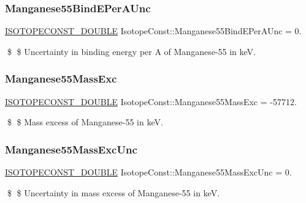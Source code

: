 \subsubsection{\texorpdfstring{Manganese55\+Bind\+E\+Per\+A\+Unc}{Manganese55BindEPerAUnc}}
{\footnotesize\ttfamily \mbox{\hyperlink{group___isotope_const-_macros_ga8f45a7272ce02c0b4c65c44636ed719a}{I\+S\+O\+T\+O\+P\+E\+C\+O\+N\+S\+T\+\_\+\+D\+O\+U\+B\+LE}} Isotope\+Const\+::\+Manganese55\+Bind\+E\+Per\+A\+Unc = 0.}

\$ \$ Uncertainty in binding energy per A of Manganese-\/55 in keV. \mbox{\label{group___isotope_const-_manganese-_mn55_ga6fbe24781375726f57bdf2a268d6f691}} 
\subsubsection{\texorpdfstring{Manganese55\+Mass\+Exc}{Manganese55MassExc}}
{\footnotesize\ttfamily \mbox{\hyperlink{group___isotope_const-_macros_ga8f45a7272ce02c0b4c65c44636ed719a}{I\+S\+O\+T\+O\+P\+E\+C\+O\+N\+S\+T\+\_\+\+D\+O\+U\+B\+LE}} Isotope\+Const\+::\+Manganese55\+Mass\+Exc = -\/57712.}

\$ \$ Mass excess of Manganese-\/55 in keV. \mbox{\label{group___isotope_const-_manganese-_mn55_gae3c9122c5c1aedb26cdaf451709fbb1f}} 
\subsubsection{\texorpdfstring{Manganese55\+Mass\+Exc\+Unc}{Manganese55MassExcUnc}}
{\footnotesize\ttfamily \mbox{\hyperlink{group___isotope_const-_macros_ga8f45a7272ce02c0b4c65c44636ed719a}{I\+S\+O\+T\+O\+P\+E\+C\+O\+N\+S\+T\+\_\+\+D\+O\+U\+B\+LE}} Isotope\+Const\+::\+Manganese55\+Mass\+Exc\+Unc = 0.}

\$ \$ Uncertainty in mass excess of Manganese-\/55 in keV. \mbox{\label{group___isotope_const-_manganese-_mn55_ga030408bc96f6cb9312e590510f2bffba}} 

